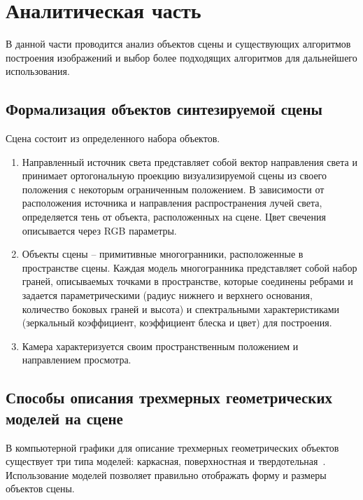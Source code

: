 \section{Аналитическая часть}

В данной части проводится анализ объектов сцены и существующих алгоритмов построения изображений и выбор более подходящих алгоритмов для дальнейшего использования.

\subsection{Формализация объектов синтезируемой сцены}

Сцена состоит из определенного набора объектов.
\begin{enumerate}
	\item Направленный источник света представляет собой вектор направления света и принимает ортогональную проекцию визуализируемой сцены из своего положения с некоторым ограниченным положением. В зависимости от расположения источника и направления распространения лучей света, определяется тень от объекта, расположенных на сцене. Цвет свечения описывается через RGB параметры.
	\item Объекты сцены -- примитивные многогранники, расположенные в пространстве сцены. Каждая модель многогранника представляет собой набор граней, описываемых точками в пространстве, которые соединены ребрами и задается параметрическими (радиус нижнего и верхнего основания, количество боковых граней и высота) и спектральными характеристиками (зеркальный коэффициент, коэффициент блеска и цвет) для построения. 
	\item Камера характеризуется своим пространственным положением и направлением просмотра.
\end{enumerate}

\subsection{Способы описания трехмерных геометрических моделей на сцене}

В компьютерной графики для описание трехмерных геометрических объектов существует три типа моделей: каркасная, поверхностная и твердотельная~\cite{aaymodelmethod}. Использование моделей позволяет правильно отображать форму и размеры объектов сцены.

